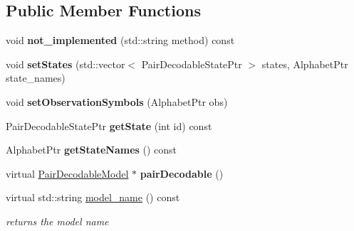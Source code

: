 \subsection*{Public Member Functions}
\begin{DoxyCompactItemize}
\item 
\mbox{\label{classtops_1_1PairDecodableModel_aaba9164fad0d0209017e503ce75bbcaf}} 
void {\bfseries not\+\_\+implemented} (std\+::string method) const
\item 
\mbox{\label{classtops_1_1PairDecodableModel_a23dfc7af7ac316f2ec625252375bdcb4}} 
void {\bfseries set\+States} (std\+::vector$<$ Pair\+Decodable\+State\+Ptr $>$ states, Alphabet\+Ptr state\+\_\+names)
\item 
\mbox{\label{classtops_1_1PairDecodableModel_ae87ccad9f6260d4c2f796b948a28840b}} 
void {\bfseries set\+Observation\+Symbols} (Alphabet\+Ptr obs)
\item 
\mbox{\label{classtops_1_1PairDecodableModel_a8a441aa6c49e92a99a4785d35fd1b047}} 
Pair\+Decodable\+State\+Ptr {\bfseries get\+State} (int id) const
\item 
\mbox{\label{classtops_1_1PairDecodableModel_a08d8be82741c7e4d7c23d0c722150733}} 
Alphabet\+Ptr {\bfseries get\+State\+Names} () const
\item 
\mbox{\label{classtops_1_1PairDecodableModel_ac36d6f35fddcbbbe4fce8aefeb04499d}} 
virtual \hyperlink{classtops_1_1PairDecodableModel}{Pair\+Decodable\+Model} $\ast$ {\bfseries pair\+Decodable} ()
\item 
\mbox{\label{classtops_1_1PairDecodableModel_ad412b8dc5649d420808eac52d3f9d316}} 
virtual std\+::string \hyperlink{classtops_1_1PairDecodableModel_ad412b8dc5649d420808eac52d3f9d316}{model\+\_\+name} () const
\begin{DoxyCompactList}\small\item\em returns the model name \end{DoxyCompactList}\item 
\mbox{\label{classtops_1_1PairDecodableModel_aa7898d82d3ea5de246b9677cb03d2c1e}} 

\end{DoxyCompactItemize}
